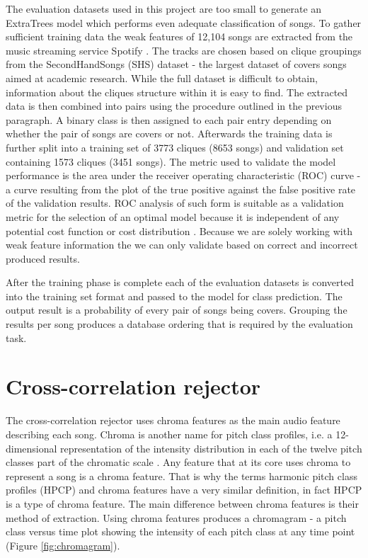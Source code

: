The evaluation datasets used in this project are too small to generate an
ExtraTrees model which performs even adequate classification of songs. To gather
sufficient training data the weak features of 12,104 songs are extracted from
the music streaming service Spotify \cite{spotify}. The tracks are chosen based
on clique groupings from the SecondHandSongs (SHS) \cite{shs} dataset - the
largest dataset of covers songs aimed at academic research. While the full
dataset is difficult to obtain, information about the cliques structure within
it is easy to find. The extracted data is then combined into pairs using the
procedure outlined in the previous paragraph. A binary class is then assigned to
each pair entry depending on whether the pair of songs are covers or not.
Afterwards the training data is further split into a training set of 3773
cliques (8653 songs) and validation set containing 1573 cliques (3451 songs).
The metric used to validate the model performance is the area under the receiver
operating characteristic (ROC) curve - a curve resulting from the plot of the
true positive against the false positive rate of the validation results. ROC
analysis of such form is suitable as a validation metric for the selection of an
optimal model because it is independent of any potential cost function or cost
distribution \cite{wiki:roc}. Because we are solely working with weak feature
information the we can only validate based on correct and incorrect produced results.

After the training phase is complete each of the evaluation datasets is
converted into the training set format and passed to the model for class
prediction. The output result is a probability of every pair of songs being
covers. Grouping the results per song produces a database ordering that is
required by the evaluation task.

\section{Cross-correlation rejector} 
\label{sec:ccs}
The cross-correlation rejector uses chroma features as the main audio feature
describing each song. Chroma is another name for pitch class profiles, i.e. a
12-dimensional representation of the intensity distribution in each of the
twelve pitch classes part of the chromatic scale \cite{fujishima1999real}. Any
feature that at its core uses chroma to represent a song is a chroma feature.
That is why the terms harmonic pitch class profiles (HPCP) and chroma features
have a very similar definition, in fact HPCP is a type of chroma feature. The
main difference between chroma features is their method of extraction. Using
chroma features produces a chromagram - a pitch class versus time plot showing
the intensity of each pitch class at any time point (Figure
\ref{fig:chromagram}).

